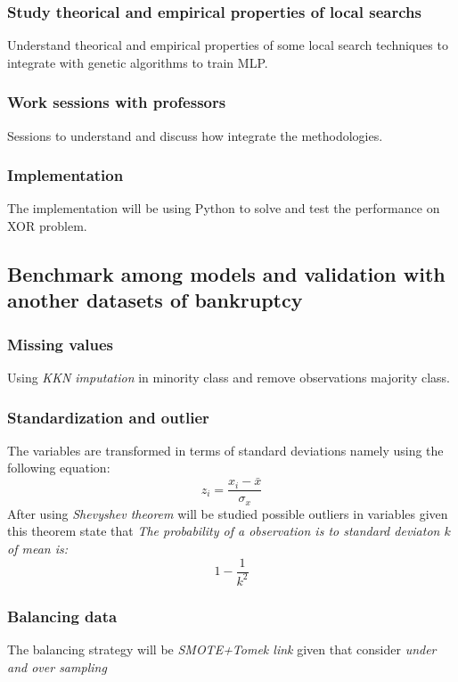 \documentclass[journal]{IEEEtai}
\begin{document}
\subsubsection{Study theorical and empirical properties of local searchs} 
Understand theorical and empirical properties of some local search techniques to integrate with genetic algorithms to train MLP.

\subsubsection{Work sessions with professors}
Sessions to understand and discuss  how integrate the methodologies.

\subsubsection{Implementation}
The implementation will be using Python to solve and test the performance on XOR problem.



\subsection{ \textbf{Benchmark among models and validation with another datasets of bankruptcy}}


\subsubsection{Missing values}
Using \textit{KKN imputation} in minority class and remove observations majority class.

\subsubsection{Standardization and outlier}
The variables are transformed in terms of standard deviations namely using the following equation:
\begin{equation}
z_{i} = \frac{x_{i} - \bar{x}}{\sigma_{x}}
\end{equation}
After using \textit{Shevyshev theorem} will be studied possible outliers in variables given this theorem  state that \textit{The probability of a observation is to standard deviaton $k$ of mean is:}
\begin{equation}
1 - \frac{1}{k^{2}}
\end{equation}


\subsubsection{Balancing data} The balancing strategy will be \textit{SMOTE+Tomek link} given that  consider \textit{under and over sampling}
\end{document}
